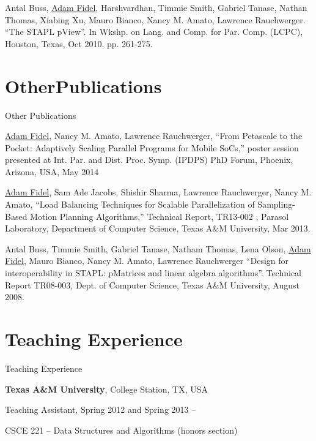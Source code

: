 \documentclass[a4paper,10pt,oneside]{article}
\begin{document}
\begin{body}
\EntryGap

{Antal Buss, \underline{Adam Fidel}, Harshvardhan, Timmie Smith, Gabriel Tanase, Nathan Thomas, Xiabing Xu, Mauro Bianco, Nancy M. Amato, Lawrence Rauchwerger. ``The STAPL pView''. In Wkshp. on Lang. and Comp. for Par. Comp. (LCPC), Houston, Texas, Oct 2010, pp. 261-275.}

\EntryGap

\section{OtherPublications}
{Other Publications}

{\underline{Adam Fidel}, Nancy M. Amato, Lawrence Rauchwerger, ``From Petascale to the Pocket: Adaptively Scaling Parallel Programs for Mobile SoCs,'' poster
session presented at Int. Par. and Dist. Proc. Symp. (IPDPS) PhD Forum, Phoenix, Arizona, USA, May 2014}

\EntryGap


{\underline{Adam Fidel}, Sam Ade Jacobs, Shishir Sharma, Lawrence Rauchwerger, Nancy M. Amato, ``Load Balancing Techniques for Scalable Parallelization of Sampling-Based Motion Planning Algorithms,'' Technical Report, TR13-002 , Parasol Laboratory, Department of Computer Science, Texas A\&M University, Mar 2013.}

\EntryGap


{Antal Buss, Timmie Smith, Gabriel Tanase, Natham Thomas, Lena Olson, \underline{Adam Fidel}, Mauro Bianco, Nancy M. Amato, Lawrence Rauchwerger ``Design for interoperability in STAPL: pMatrices and linear algebra algorithms''. Technical Report TR08-003, Dept. of Computer Science, Texas A\&M University, August 2008.}


\section{Teaching Experience}
{Teaching Experience}

{\textbf{Texas A\&M University}},
College Station, TX, USA
\par
Teaching Assistant, Spring 2012 and Spring 2013
\hfill
{} --
\begin{detail}
CSCE 221 -- Data Structures and Algorithms (honors section)
\end{detail}




\end{body}
\end{document}
